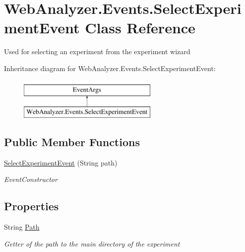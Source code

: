 \hypertarget{class_web_analyzer_1_1_events_1_1_select_experiment_event}{}\section{Web\+Analyzer.\+Events.\+Select\+Experiment\+Event Class Reference}
\label{class_web_analyzer_1_1_events_1_1_select_experiment_event}


Used for selecting an experiment from the experiment wizard  


Inheritance diagram for Web\+Analyzer.\+Events.\+Select\+Experiment\+Event\+:\begin{figure}[H]
\begin{center}
\leavevmode
\includegraphics[height=2.000000cm]{class_web_analyzer_1_1_events_1_1_select_experiment_event}
\end{center}
\end{figure}
\subsection*{Public Member Functions}
\begin{DoxyCompactItemize}
\item 
\hyperlink{class_web_analyzer_1_1_events_1_1_select_experiment_event_afee7e3e19fb7c79418750e617d242585}{Select\+Experiment\+Event} (String path)
\begin{DoxyCompactList}\small\item\em Event\+Constructor \end{DoxyCompactList}\end{DoxyCompactItemize}
\subsection*{Properties}
\begin{DoxyCompactItemize}
\item 
String \hyperlink{class_web_analyzer_1_1_events_1_1_select_experiment_event_a7c9d614ac51f5dadaba4f5dd5e38c9d3}{Path}
\begin{DoxyCompactList}\small\item\em Getter of the path to the main directory of the experiment \end{DoxyCompactList}\end{DoxyCompactItemize}
